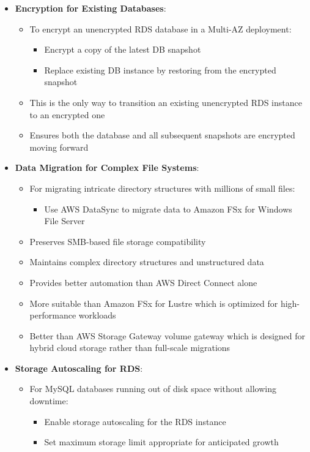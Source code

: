 \documentclass[11pt,a4paper]{report}
\begin{document}
\begin{itemize}
\begin{itemize}
\end{itemize}
  \item \textbf{Encryption for Existing Databases}:
\begin{itemize}
  \item To encrypt an unencrypted RDS database in a Multi-AZ deployment:
\begin{itemize}
  \item Encrypt a copy of the latest DB snapshot
  \item Replace existing DB instance by restoring from the encrypted snapshot
\end{itemize}
  \item This is the only way to transition an existing unencrypted RDS instance to an encrypted one
  \item Ensures both the database and all subsequent snapshots are encrypted moving forward
\end{itemize}
  \item \textbf{Data Migration for Complex File Systems}:
\begin{itemize}
  \item For migrating intricate directory structures with millions of small files:
\begin{itemize}
  \item Use AWS DataSync to migrate data to Amazon FSx for Windows File Server
\end{itemize}
  \item Preserves SMB-based file storage compatibility
  \item Maintains complex directory structures and unstructured data
  \item Provides better automation than AWS Direct Connect alone
  \item More suitable than Amazon FSx for Lustre which is optimized for high-performance workloads
  \item Better than AWS Storage Gateway volume gateway which is designed for hybrid cloud storage rather than full-scale migrations
\end{itemize}
  \item \textbf{Storage Autoscaling for RDS}:
\begin{itemize}
  \item For MySQL databases running out of disk space without allowing downtime:
\begin{itemize}
  \item Enable storage autoscaling for the RDS instance
  \item Set maximum storage limit appropriate for anticipated growth

\end{itemize}
\end{itemize}
\end{itemize}
\end{document}
